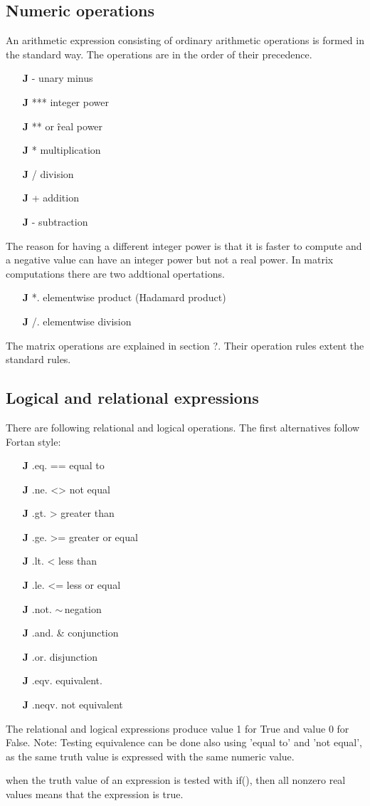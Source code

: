\subsection{Numeric operations}
\label{numer}
An arithmetic expression consisting of ordinary arithmetic operations is formed in
the standard way. The operations are in the order of their precedence.
\begin{itemize}
\item[\textbf{J}] - unary minus
\item[\textbf{J}] *** integer power
\item[\textbf{J}] ** or \^ real power
\item[\textbf{J}] * multiplication
\item[\textbf{J}] / division
\item[\textbf{J}] + addition
\item[\textbf{J}] - subtraction
\end{itemize}
The reason for having a different integer power is that it is faster to compute and a negative
value can have an integer power but not a real power.
In matrix computations there are two addtional opertations.
\begin{itemize}
\item[\textbf{J}] *. elementwise product (Hadamard product)
\item[\textbf{J}] /. elementwise division
\end{itemize}
The matrix operations are explained in section ?. Their operation rules extent
the standard rules.
\subsection{Logical and relational expressions}
\label{logic}
There are following relational and logical operations. The first alternatives
follow Fortan style:
\begin{itemize}
\item[\textbf{J}] .eq. == equal to
\item[\textbf{J}] .ne. <> not equal
\item[\textbf{J}] .gt. > greater than
\item[\textbf{J}] .ge. >= greater or equal
\item[\textbf{J}].lt. < less than
\item[\textbf{J}] .le. <= less or equal
\item[\textbf{J}].not. $\sim$\,negation
\item[\textbf{J}] .and. & conjunction
\item[\textbf{J}] .or. disjunction
\item[\textbf{J}] .eqv. equivalent.
\item[\textbf{J}] .neqv. not equivalent
\end{itemize}
The relational and logical expressions produce value 1 for True and value 0 for False.
Note: Testing equivalence can be done also using 'equal to' and 'not equal', as the same truth
value is expressed with the same numeric value.
\begin{note}
when the truth value of an expression is tested with \textcolor{VioletRed}{if}(), then all nonzero real values
means that the expression is true.
\end{note}
